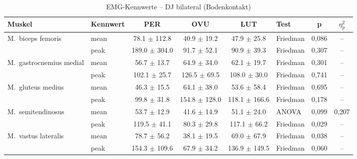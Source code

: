 \begin{table}[H]
  \centering
  \caption{EMG-Kennwerte – DJ bilateral (Bodenkontakt)}
  \label{tab:DJ_bilateral_Bodenkontakt}
  \small
  \begin{tabular}{l l c c c l c c}
    \hline
    \textbf{Muskel} & \textbf{Kennwert} & \textbf{PER} & \textbf{OVU} & \textbf{LUT} & \textbf{Test} & \textbf{p} & \textbf{$\eta^2_p$} \\
    \hline
    M.~biceps femoris & mean & 78.1 $\pm$ 112.8 & 40.9 $\pm$ 19.2 & 47.9 $\pm$ 25.8 & Friedman & 0{,}086 & -- \\
     & peak & 189.0 $\pm$ 304.0 & 91.7 $\pm$ 52.1 & 90.9 $\pm$ 39.3 & Friedman & 0{,}307 & -- \\
    \hline
    M.~gastrocnemius medial & mean & 56.7 $\pm$ 13.7 & 64.9 $\pm$ 34.0 & 62.1 $\pm$ 19.7 & Friedman & 0{,}301 & -- \\
     & peak & 102.1 $\pm$ 25.7 & 126.5 $\pm$ 69.5 & 108.0 $\pm$ 30.0 & Friedman & 0{,}741 & -- \\
    \hline
    M.~gluteus medius & mean & 46.3 $\pm$ 15.5 & 64.1 $\pm$ 38.0 & 53.6 $\pm$ 58.4 & Friedman & 0{,}695 & -- \\
     & peak & 99.8 $\pm$ 31.8 & 154.8 $\pm$ 128.0 & 118.1 $\pm$ 166.6 & Friedman & 0{,}178 & -- \\
    \hline
    M.~semitendinosus & mean & 53.7 $\pm$ 12.9 & 41.6 $\pm$ 14.9 & 51.1 $\pm$ 24.0 & ANOVA & 0{,}099 & 0{,}207 \\
     & peak & 119.5 $\pm$ 41.1 & 80.3 $\pm$ 29.8 & 117.1 $\pm$ 66.2 & Friedman & 0{,}029 & -- \\
    \hline
    M.~vastus lateralis & mean & 78.7 $\pm$ 56.2 & 38.1 $\pm$ 19.5 & 69.0 $\pm$ 67.9 & Friedman & 0{,}038 & -- \\
     & peak & 154.3 $\pm$ 109.6 & 67.9 $\pm$ 34.2 & 136.9 $\pm$ 149.5 & Friedman & 0{,}060 & -- \\
    \hline
  \end{tabular}
\end{table}

